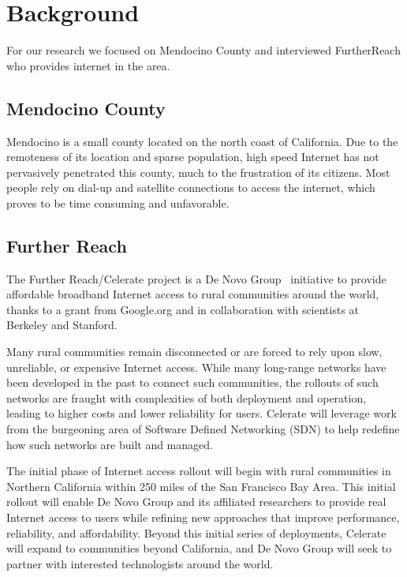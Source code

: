 
\section{Background}
\label{sec:background}
For our research we focused on Mendocino County and interviewed FurtherReach who provides internet in the area.

\subsection{Mendocino County}
\label{sec:mendocino-county}

Mendocino is a small county located on the north coast of California. Due to
the remoteness of its location and sparse population, high speed Internet has
not pervasively penetrated this county, much to the frustration of its citizens.
Most people rely on dial-up and satellite connections to access the internet, which proves to be time consuming and unfavorable.


\subsection{Further Reach}
\label{sec:further-reach}


The Further Reach/Celerate project is a De Novo Group~\cite{denovo} initiative
to provide affordable broadband Internet access to rural communities around the
world, thanks to a grant from Google.org and in collaboration with scientists at
Berkeley and Stanford.

Many rural communities remain disconnected or are forced to rely upon slow,
unreliable, or expensive Internet access. While many long-range networks have
been developed in the past to connect such communities, the rollouts of such
networks are fraught with complexities of both deployment and operation, leading
to higher costs and lower reliability for users. Celerate will leverage work
from the burgeoning area of Software Defined Networking (SDN) to help redefine
how such networks are built and managed.

The initial phase of Internet access rollout will begin with rural communities
in Northern California within 250 miles of the San Francisco Bay Area. This
initial rollout will enable De Novo Group and its affiliated researchers to
provide real Internet access to users while refining new approaches that improve
performance, reliability, and affordability. Beyond this initial series of
deployments, Celerate will expand to communities beyond California, and De Novo
Group will seek to partner with interested technologists around the world.

